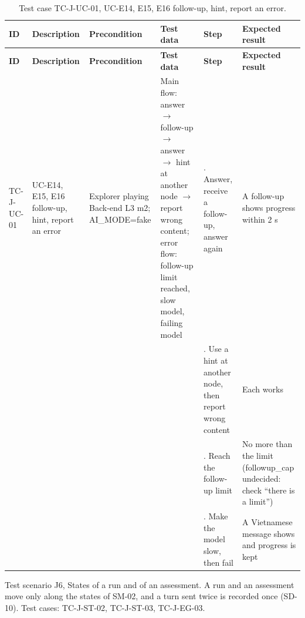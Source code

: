 {\footnotesize{}\renewcommand{\arraystretch}{1.1}
\begin{longtable}{|>{\raggedright\arraybackslash}p{}|>{\raggedright\arraybackslash}p{}|>{\raggedright\arraybackslash}p{}|>{\raggedright\arraybackslash}p{}|>{\raggedright\arraybackslash}p{}|>{\raggedright\arraybackslash}p{}|}
\caption{Test case TC-J-UC-01, UC-E14, E15, E16 follow-up, hint, report an error.} \\
\hline
\textbf{ID} & \textbf{Description} & \textbf{Precondition} & \textbf{Test data} & \textbf{Step} & \textbf{Expected result} \\ \hline
\endfirsthead
\hline
\textbf{ID} & \textbf{Description} & \textbf{Precondition} & \textbf{Test data} & \textbf{Step} & \textbf{Expected result} \\ \hline
\endhead
TC-J-UC-01 & UC-E14, E15, E16 follow-up, hint, report an error & Explorer playing Back-end L3 m2; AI\_\allowbreak{}MODE=fake & Main flow: answer $\rightarrow$ follow-up $\rightarrow$ answer $\rightarrow$ hint at another node $\rightarrow$ report wrong content; error flow: follow-up limit reached, slow model, failing model & 1. Answer, receive a follow-up, answer again & A follow-up shows progress within 2 s \\ \cline{5-6}
 &  &  &  & 2. Use a hint at another node, then report wrong content & Each works \\ \cline{5-6}
 &  &  &  & 3. Reach the follow-up limit & No more than the limit (followup\_\allowbreak{}cap undecided: check ``there is a limit'') \\ \cline{5-6}
 &  &  &  & 4. Make the model slow, then fail & A Vietnamese message shows and progress is kept \\ \hline
\end{longtable}
}

Test scenario J6, States of a run and of an assessment. A run and an assessment move only along the states of SM-02, and a turn sent twice is recorded once (SD-10). Test cases: TC-J-ST-02, TC-J-ST-03, TC-J-EG-03.

